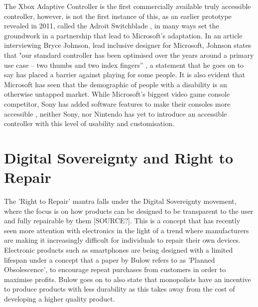 The Xbox Adaptive Controller is the first commercially available truly accessible controller, however, is not the first instance of this, as an earlier prototype revealed in 2011, called the Adroit Switchblade \cite{ablegamer}, in many ways set the groundwork in a partnership that lead to Microsoft's adaptation.
In an article interviewing Bryce Johnson, lead inclusive designer for Microsoft, Johnson states that "our standard controller has been optimised over the years around a primary use case – two thumbs and two index fingers” \cite{disabilitygaming}, a statement that he goes on to say has placed a barrier against playing for some people.
It is also evident that Microsoft has seen that the demographic of people with a disability is an otherwise untapped market.
While Microsoft's biggest video game console competitor, Sony has added software features to make their consoles more accessible \cite{sony}, neither Sony, nor Nintendo has yet to introduce an accessible controller with this level of usability and customisation.


\section{Digital Sovereignty and Right to Repair}

The 'Right to Repair' mantra falls under the Digital Sovereignty movement, where the focus is on how products can be designed to be transparent to the user and fully repairable by them [SOURCE?].
This is a concept that has recently seen more attention with electronics in the light of a trend where manufacturers are making it increasingly difficult for individuals to repair their own devices.
Electronic products such as smartphones are being designed with a limited lifespan under a concept that a paper by Bulow \cite{obsolescence} refers to as 'Planned Obsolescence', to encourage repeat purchases from customers in order to maximise profits.
Bulow goes on to also state that monopolists have an incentive to produce products with less durability as this takes away from the cost of developing a higher quality product.


